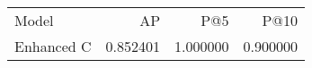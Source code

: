 \begin{tabular}{lrrr}
Model & AP & P@5 & P@10 \\
Enhanced C & 0.852401 & 1.000000 & 0.900000 \\
\end{tabular}
